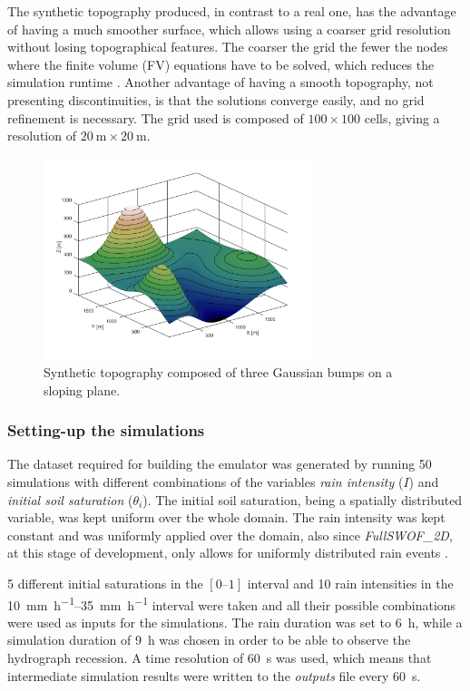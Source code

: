 The synthetic topography produced, in contrast to a real one, has the advantage of having a much smoother surface, which allows using a coarser grid resolution without losing topographical features.
The coarser the grid the fewer the nodes where the finite volume (FV) equations have to be solved, which reduces the simulation runtime . 
Another advantage of having a smooth topography, not presenting discontinuities, is that the solutions converge easily, and no grid refinement is necessary.
The grid used is composed of $\num{100} \times \num{100}$ cells, giving a resolution of $\SI{20}{\meter} \times \SI{20}{\meter}.$

\begin{figure}[h]
  \centering
  \includegraphics[width=0.7\textwidth]{Figures/topography.png}
  \caption{Synthetic topography composed of three Gaussian bumps on a sloping plane.}
  \label{fig:topography}
\end{figure}


\subsubsection{Setting-up the simulations}

The dataset required for building the emulator was generated by running \num{50} simulations with different combinations of the variables \emph{rain intensity} ($I$) and \emph{initial soil saturation} ($\theta_i$).
The initial soil saturation, being a spatially distributed variable, was kept uniform over the whole domain.
The rain intensity was kept constant and was uniformly applied over the domain, also since \textit{FullSWOF\_2D}, at this stage of development, only allows for uniformly distributed rain events \autocite{laguerre_documentation_2016}.

\num{5} different initial saturations in the $[\numrange{0}{1}]$ interval and \num{10} rain intensities in the \SIrange{10}{35}{\milli\metre\per\hour} interval were taken and all their possible combinations were used as inputs for the simulations.
The rain duration was set to \SI{6}{\hour}, while a simulation duration of \SI{9}{\hour} was chosen in order to be able to observe the hydrograph recession. A time resolution of \SI{60}{\second} was used, which means that intermediate simulation results were written to the \emph{outputs} file every \SI{60}{\second}.


